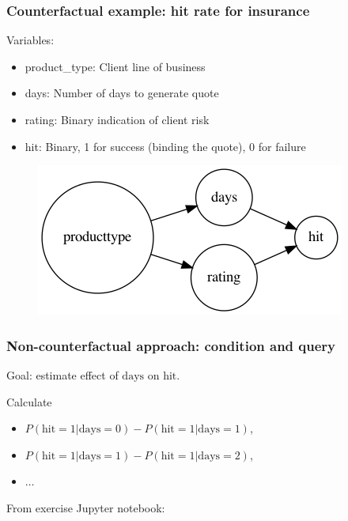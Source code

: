 \begin{frame}
    \frametitle{Counterfactual example: hit rate for insurance}
    Variables:
    \begin{itemize}
    \item product\_type: Client line of business
    \item days: Number of days to generate quote
    \item rating: Binary indication of client risk
    \item hit: Binary, 1 for success (binding the quote), 0 for failure\newline
    \end{itemize}
    
    \begin{figure}[ht]
    \includegraphics[height=0.6\textheight]{graphics/hits}
    \end{figure}
\end{frame}



\begin{frame}
\frametitle{Non-counterfactual approach: condition and query}

Goal: estimate effect of $\textrm{days}$ on $\textrm{hit}$.\newline

Calculate
\begin{itemize}
\item $P(\textrm{hit}=1 | \textrm{days} = 0) - P(\textrm{hit}=1 | \textrm{days} = 1)$,
\item $P(\textrm{hit}=1 | \textrm{days} = 1) - P(\textrm{hit}=1 | \textrm{days} = 2)$,
\item $\ldots$ \newline
\end{itemize}

From exercise Jupyter notebook:\newline

\end{frame}


